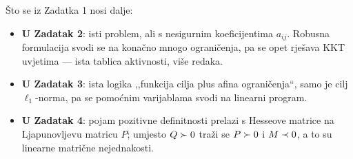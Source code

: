 \begin{predznanje}
Što se iz Zadatka 1 nosi dalje:
\begin{itemize}[leftmargin=*]
  \item \textbf{U Zadatak 2}: isti problem, ali s nesigurnim koeficijentima
        $a_{ij}$. Robusna formulacija svodi se na konačno mnogo ograničenja, pa
        se opet rješava KKT uvjetima --- ista tablica aktivnosti, više redaka.
  \item \textbf{U Zadatak 3}: ista logika ,,funkcija cilja plus afina
        ograničenja``, samo je cilj $\ell_1$-norma, pa se pomoćnim varijablama
        svodi na linearni program.
  \item \textbf{U Zadatak 4}: pojam pozitivne definitnosti prelazi s Hesseove
        matrice na Ljapunovljevu matricu $P$; umjesto $Q \succ 0$ traži se
        $P \succ 0$ i $M \prec 0$, a to su linearne matrične nejednakosti.
\end{itemize}
\end{predznanje}

